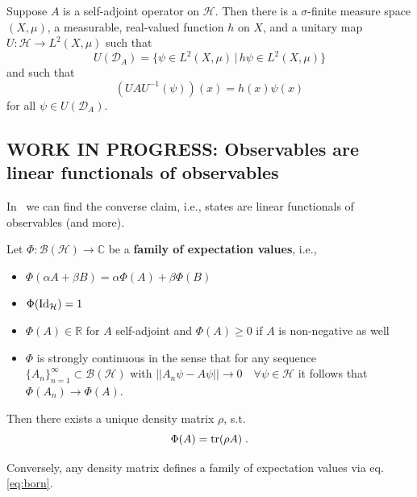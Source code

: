 \begin{thrm}\label{rp_qm_obs_spectral_mult}
	Suppose $A$ is a self-adjoint operator on $\mathcal{H}$. Then there is a $\sigma$-finite measure space $(X, \mu)$, a measurable, real-valued function $h$ on $X$, and a unitary map $U: \mathcal{H} \to L^{2}(X, \mu)$ such that
	\begin{equation}
		U(\mathcal{D}_{A}) = \{ \psi \in L^{2}(X, \mu) \, | \, h \psi \in L^{2}(X, \mu) \}
	\end{equation}
	and such that
	\begin{equation}
		(UAU^{-1}( \psi ))(x) = h(x) \psi(x)
	\end{equation}
	for all $\psi \in U(\mathcal{D}_{A})$.
\end{thrm}

\subsection{WORK IN PROGRESS: Observables are linear functionals of observables}
In~\cite{hall13} we can find the converse claim, i.e., states are linear functionals of observables (and more).
\begin{thrm}\label{th:hall}
	Let $\Phi: \mathcal{B}(\mathcal{H}) \to \mathbb{C}$ be a \textbf{family of expectation values}, i.e.,
	\begin{itemize}
		\item $\Phi( \alpha A + \beta B ) = \alpha \Phi( A ) + \beta \Phi( B )$
		\item $\Phi( \operatorname{Id}_{\mathcal{H}} ) = 1$
		\item $\Phi( A ) \in \mathbb{R}$ for $A$ self-adjoint and $\Phi(A) \ge 0$ if $A$ is non-negative as well
		\item $\Phi$ is strongly continuous in the sense that for any sequence $\{A_{n}\}_{n=1}^{\infty} \subset \mathcal{B}(\mathcal{H})$ with $|| A_{n} \psi - A \psi || \to 0 \quad \forall \psi \in \mathcal{H}$ it follows that $\Phi(A_{n}) \to \Phi(A)$.
	\end{itemize}

	Then there exists a unique density matrix $\rho$, s.t.
	\begin{equation}\label{eq:born}
		\Phi(A) = \operatorname{tr}(\rho A) \; .
	\end{equation}

	Conversely, any density matrix defines a family of expectation values via eq. \eqref{eq:born}.
\end{thrm}


